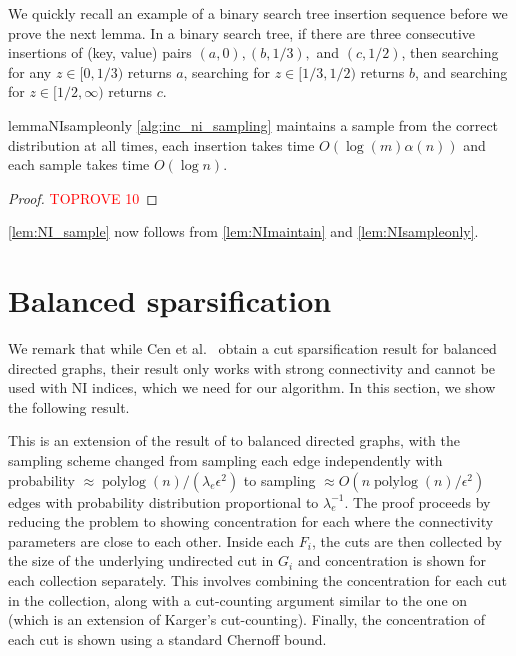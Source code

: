\documentclass[11pt,a4paper]{article}
\newcommand{\polylog}{\operatorname{polylog}}
\newcommand{\eps}{\epsilon}
\begin{document}
We quickly recall an example of a binary search tree insertion sequence before we prove the next lemma. In a binary search tree, if there are three consecutive insertions of (key, value) pairs $(a, 0), (b, 1/3),$ and $(c, 1/2)$, then searching for any $z \in [0, 1/3)$ returns $a$, searching for $z \in [1/3, 1/2)$ returns $b$, and searching for $z \in [1/2, \infty)$ returns $c$.

\begin{restatable}{lemma}{NIsampleonly}
\label{lem:NIsampleonly}
\cref{alg:inc_ni_sampling} maintains a sample from the correct distribution at all times, each insertion takes time $O(\log (m) \alpha(n))$ and each sample takes time $O(\log n)$.
\end{restatable}
\begin{proof}\textcolor{red}{TOPROVE 10}\end{proof}

\cref{lem:NI_sample} now follows from \cref{lem:NImaintain} and \cref{lem:NIsampleonly}.
\section{Balanced sparsification}
\label{sec:balanced_sparsification}

We remark that while Cen et al.~\cite{CCPS21cutbalance} obtain a cut sparsification result for balanced directed graphs, their result only works with strong connectivity and cannot be used with NI indices, which we need for our algorithm.
In this section, we show the following result.

\generalsparsification*

This is an extension of the result of \cite{FHHP19sparsification} to balanced directed graphs, with the sampling scheme changed from sampling each edge independently with probability $\approx \polylog (n)/(\lambda_e \eps^2)$ to sampling $\approx O( n \polylog(n)/ \eps^2)$ edges with probability distribution proportional to $\lambda_e^{-1}$. The proof proceeds by reducing the problem to showing concentration for each \connectivityclass where the connectivity parameters are close to each other. Inside each \connectivityclass $F_i$, the cuts are then collected by the size of the underlying undirected cut in $G_i$ and concentration is shown for each collection separately. This involves combining the concentration for each cut in the collection, along with a cut-counting argument similar to the one on \cite{FHHP19sparsification} (which is an extension of Karger's cut-counting). Finally, the concentration of each cut is shown using a standard Chernoff bound.
\end{document}
